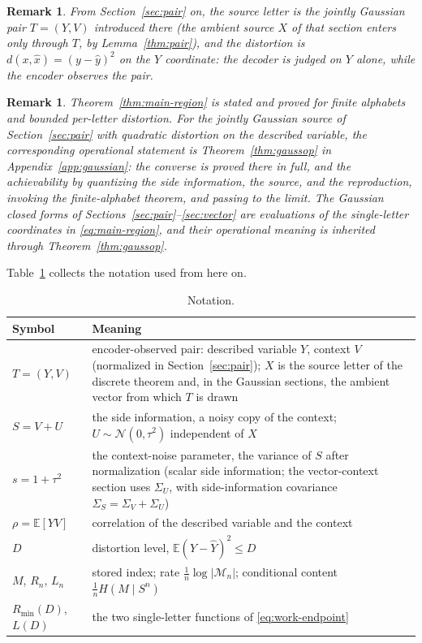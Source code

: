 \documentclass[11pt,onecolumn]{IEEEtran}
\newtheorem{remark}[theorem]{Remark}
\newcommand{\E}{\mathbb{E}}
\newcommand{\hY}{\widehat{Y}}
\begin{document}
\begin{remark}\label{rem:specialization}
From Section~\ref{sec:pair} on, the source letter is the jointly Gaussian
pair $T=(Y,V)$ introduced there (the ambient source $X$ of that section
enters only through $T$, by Lemma~\ref{thm:pair}), and the distortion is
$d(x,\hat x)=(y-\hat y)^2$ on the $Y$ coordinate: the decoder is judged on
$Y$ alone, while the encoder observes the pair.
\end{remark}

\begin{remark}\label{rem:scope}
Theorem~\ref{thm:main-region} is stated and proved for finite alphabets and
bounded per-letter distortion. For the jointly Gaussian source of
Section~\ref{sec:pair} with quadratic distortion on the described
variable, the corresponding operational statement is
Theorem~\ref{thm:gaussop} in Appendix~\ref{app:gaussian}: the converse
is proved there in full, and the achievability by quantizing the side information, the source, and the
reproduction, invoking the finite-alphabet theorem, and passing to the
limit. The Gaussian closed forms of
Sections~\ref{sec:pair}--\ref{sec:vector} are evaluations of the
single-letter coordinates in \eqref{eq:main-region}, and their
operational meaning is inherited through Theorem~\ref{thm:gaussop}.
\end{remark}

Table~\ref{tab:notation} collects the notation used from here on.

\begin{table}[!t]
\caption{Notation.}
\label{tab:notation}
\centering
\footnotesize
\begin{tabular}{p{1.35in}p{4.55in}}
\hline
Symbol & Meaning\\
\hline
$T=(Y,V)$ & encoder-observed pair: described variable $Y$, context $V$
(normalized in Section~\ref{sec:pair}); $X$ is the source letter of the
discrete theorem and, in the Gaussian sections, the ambient vector from
which $T$ is drawn\\
$S=V+U$ & the side information, a noisy copy of the context; $U\sim\mathcal N(0,\tau^2)$
independent of $X$\\
$s=1+\tau^2$ & the context-noise parameter, the variance of $S$ after
normalization (scalar side information;
the vector-context section uses $\Sigma_U$, with side-information
covariance $\Sigma_S=\Sigma_V+\Sigma_U$)\\
$\rho=\E[YV]$ & correlation of the described variable and the context\\
$D$ & distortion level, $\E(Y-\hY)^2\le D$\\
$M$, $R_n$, $L_n$ & stored index; rate $\tfrac1n\log|\mathcal M_n|$;
conditional content $\tfrac1n H(M\mid S^n)$\\
$R_{\min}(D)$, $L(D)$ & the two single-letter functions of
\eqref{eq:work-endpoint}\\
\hline
\end{tabular}
\end{table}
\end{document}
